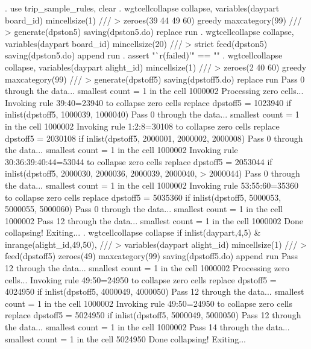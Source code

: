 . use trip_sample_rules, clear
{\smallskip}
. wgtcellcollapse collapse, variables(daypart board_id) mincellsize(1) ///
>         zeroes(39 44 49 60) greedy maxcategory(99) ///
>         generate(dpston5) saving(dpston5.do) replace run
\smallskip
\oom
\smallskip
. wgtcellcollapse collapse, variables(daypart board_id) mincellsize(20) ///
>         strict feed(dpston5) saving(dpston5.do) append run
\smallskip
\oom
\smallskip
. assert "`r(failed)'" == ""
{\smallskip}
. wgtcellcollapse collapse, variables(daypart alight_id) mincellsize(1) ///
>         zeroes(2 40 60) greedy maxcategory(99) ///
>         generate(dpstoff5) saving(dpstoff5.do) replace run
Pass 0 through the data...
  smallest count = 1 in the cell      1000002
{\smallskip}
Processing zero cells...
{\smallskip}
  Invoking rule 39:40=23940 to collapse zero cells
  replace dpstoff5 = 1023940 if inlist(dpstoff5, 1000039, 1000040)
Pass 0 through the data...
  smallest count = 1 in the cell      1000002
  Invoking rule 1:2:8=30108 to collapse zero cells
  replace dpstoff5 = 2030108 if inlist(dpstoff5, 2000001, 2000002, 2000008)
Pass 0 through the data...
  smallest count = 1 in the cell      1000002
  Invoking rule 30:36:39:40:44=53044 to collapse zero cells
  replace dpstoff5 = 2053044 if inlist(dpstoff5, 2000030, 2000036, 2000039, 2000040,
>  2000044)
\smallskip
\oom
\smallskip
Pass 0 through the data...
  smallest count = 1 in the cell      1000002
  Invoking rule 53:55:60=35360 to collapse zero cells
  replace dpstoff5 = 5035360 if inlist(dpstoff5, 5000053, 5000055, 5000060)
Pass 0 through the data...
  smallest count = 1 in the cell      1000002
Pass 12 through the data...
  smallest count = 1 in the cell      1000002
  Done collapsing! Exiting...
{\smallskip}
. wgtcellcollapse collapse if inlist(daypart,4,5) \& inrange(alight_id,49,50), ///
>         variables(daypart alight_id) mincellsize(1) ///
>         feed(dpstoff5) zeroes(49) maxcategory(99) saving(dpstoff5.do) append run
Pass 12 through the data...
  smallest count = 1 in the cell      1000002
{\smallskip}
Processing zero cells...
{\smallskip}
  Invoking rule 49:50=24950 to collapse zero cells
  replace dpstoff5 = 4024950 if inlist(dpstoff5, 4000049, 4000050)
Pass 12 through the data...
  smallest count = 1 in the cell      1000002
  Invoking rule 49:50=24950 to collapse zero cells
  replace dpstoff5 = 5024950 if inlist(dpstoff5, 5000049, 5000050)
Pass 12 through the data...
  smallest count = 1 in the cell      1000002
Pass 14 through the data...
  smallest count = 1 in the cell      5024950
  Done collapsing! Exiting...
{\smallskip}

